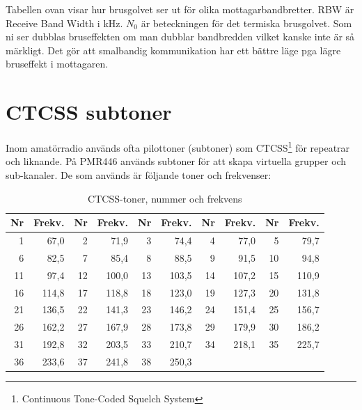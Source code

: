 Tabellen ovan visar hur brusgolvet ser ut för olika mottagarbandbretter. RBW är
Receive Band Width i kHz. $N_0$ är beteckningen för det termiska brusgolvet. Som
ni ser dubblas bruseffekten om man dubblar bandbredden vilket kanske inte är så
märkligt. Det gör att smalbandig kommunikation har ett bättre läge pga lägre
bruseffekt i mottagaren.


\section{CTCSS subtoner}

Inom amatörradio används ofta pilottoner (subtoner) som
CTCSS\footnote{Continuous Tone-Coded Squelch System} för repeatrar och
liknande. På PMR446 används subtoner för att skapa virtuella grupper och
sub-kanaler. De som används är följande toner och frekvenser:

\begin{table}[H]
\centering
\begin{tabular}{rr|rr|rr|rr|rr}
\textbf{Nr} & \textbf{Frekv.} & \textbf{Nr} & \textbf{Frekv.} & \textbf{Nr} & \textbf{Frekv.} & \textbf{Nr} & \textbf{Frekv.} & \textbf{Nr} & \textbf{Frekv.} \\ \hline
	 1  & 67,0            & 2           & 71,9            & 3           & 74,4            & 4           & 77,0            & 5           & 79,7            \\ \hline
	 6  & 82,5            & 7           & 85,4            & 8           & 88,5            & 9           & 91,5            & 10          & 94,8            \\ \hline
	11  & 97,4            & 12          & 100,0           & 13          & 103,5           & 14          & 107,2           & 15          & 110,9           \\ \hline
	16  & 114,8           & 17          & 118,8           & 18          & 123,0           & 19          & 127,3           & 20          & 131,8           \\ \hline
	21  & 136,5           & 22          & 141,3           & 23          & 146,2           & 24          & 151,4           & 25          & 156,7           \\ \hline
	26  & 162,2           & 27          & 167,9           & 28          & 173,8           & 29          & 179,9           & 30          & 186,2           \\ \hline
	31  & 192,8           & 32          & 203,5           & 33          & 210,7           & 34          & 218,1           & 35          & 225,7           \\ \hline
	36  & 233,6           & 37          & 241,8           & 38          & 250,3           &             &                 &             &
\end{tabular}
\caption{CTCSS-toner, nummer och frekvens}
\end{table}


